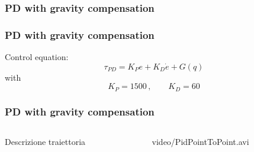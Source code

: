 \subsubsection{PD with gravity compensation}
\begin{frame}
\frametitle{PD with gravity compensation}
Control equation:
\begin{equation}
	\tau_{PD} = K_Pe + K_D\dot{e}+G(q)
\end{equation}
with
\[ K_P = 1500\,, \qquad K_D = 60\]
\end{frame}
%
\begin{frame}
\frametitle{PD with gravity compensation}
%
\begin{columns}
\begin{column}{0.4\textwidth}
	Descrizione traiettoria
\end{column}
\begin{column}{0.6\textwidth}
	\begin{center}
		{video/PidPointToPoint.avi}
	\end{center}
\end{column}
\end{columns}
\end{frame}
%
